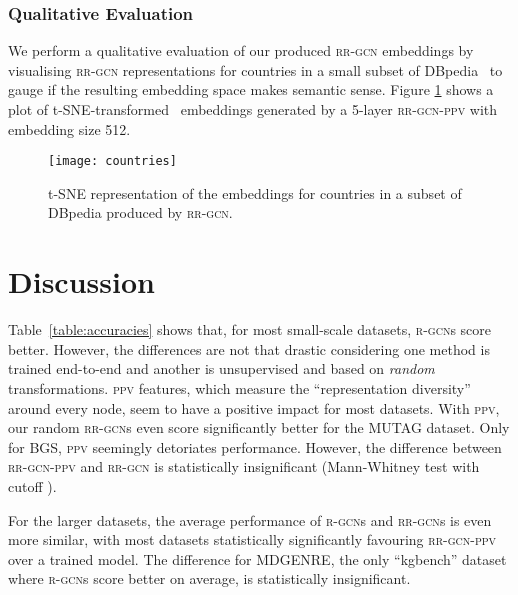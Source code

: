 \documentclass{llncs}
\begin{document}
\subsubsection{Qualitative Evaluation} \label{sec:qual_evaluation}
We perform a qualitative evaluation of our produced \textsc{rr-gcn} embeddings by visualising \textsc{rr-gcn} representations for countries in a small subset of DBpedia~\cite{dbpedia,dbpedia_countries} to gauge if the resulting embedding space makes semantic sense. Figure \ref{fig:t-sne-countries} shows a plot of t-SNE-transformed~\cite{van2008visualizing} embeddings generated by a 5-layer \textsc{rr-gcn-ppv} with embedding size 512.
\begin{figure}[h!]
    \centering
    \texttt{[image: countries]}
    \caption{t-SNE representation of the embeddings for countries in a subset of DBpedia produced by \textsc{rr-gcn}.}
    \label{fig:t-sne-countries}
\end{figure}

\section{Discussion} 
Table~\ref{table:accuracies} shows that, for most small-scale datasets, \textsc{r-gcn}s score better. However, the differences are not that drastic considering one method is trained end-to-end and another is unsupervised and based on \textit{random} transformations.
\textsc{ppv} features, which measure the ``representation diversity'' around every node, seem to have a positive impact for most datasets. With \textsc{ppv}, our random \textsc{rr-gcn}s even score significantly better for the MUTAG dataset. Only for BGS, \textsc{ppv} seemingly detoriates performance. However, the difference between \textsc{rr-gcn-ppv} and \textsc{rr-gcn} is statistically insignificant (Mann-Whitney test with cutoff ).

For the larger datasets, the average performance of \textsc{r-gcn}s and \textsc{rr-gcn}s is even more similar, with most datasets statistically significantly favouring \textsc{rr-gcn-ppv} over a trained model. The difference for MDGENRE, the only ``kgbench'' dataset where \textsc{r-gcn}s score better on average, is statistically insignificant. 
\end{document}

